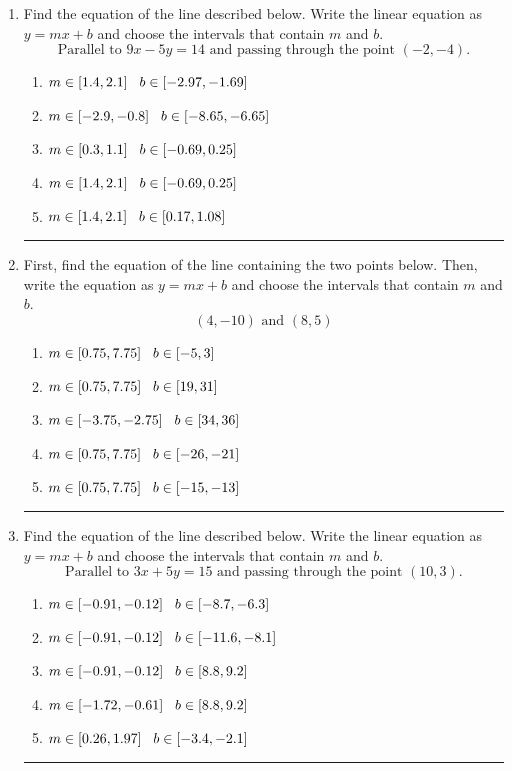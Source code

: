 \documentclass[14pt]{extbook}
\newcommand{\litem}[1]{\item#1\hspace*{-1cm}\rule{\textwidth}{0.4pt}}
\begin{document}
\begin{enumerate}
\litem{
Find the equation of the line described below. Write the linear equation as $ y=mx+b $ and choose the intervals that contain $m$ and $b$.\[ \text{Parallel to } 9 x - 5 y = 14 \text{ and passing through the point } (-2, -4). \]\begin{enumerate}[label=\Alph*.]
\item \( m \in [1.4, 2.1] \hspace*{3mm} b \in [-2.97, -1.69] \)
\item \( m \in [-2.9, -0.8] \hspace*{3mm} b \in [-8.65, -6.65] \)
\item \( m \in [0.3, 1.1] \hspace*{3mm} b \in [-0.69, 0.25] \)
\item \( m \in [1.4, 2.1] \hspace*{3mm} b \in [-0.69, 0.25] \)
\item \( m \in [1.4, 2.1] \hspace*{3mm} b \in [0.17, 1.08] \)

\end{enumerate} }
\litem{
First, find the equation of the line containing the two points below. Then, write the equation as $ y=mx+b $ and choose the intervals that contain $m$ and $b$.\[ (4, -10) \text{ and } (8, 5) \]\begin{enumerate}[label=\Alph*.]
\item \( m \in [0.75, 7.75] \hspace*{3mm} b \in [-5, 3] \)
\item \( m \in [0.75, 7.75] \hspace*{3mm} b \in [19, 31] \)
\item \( m \in [-3.75, -2.75] \hspace*{3mm} b \in [34, 36] \)
\item \( m \in [0.75, 7.75] \hspace*{3mm} b \in [-26, -21] \)
\item \( m \in [0.75, 7.75] \hspace*{3mm} b \in [-15, -13] \)

\end{enumerate} }
\litem{
Find the equation of the line described below. Write the linear equation as $ y=mx+b $ and choose the intervals that contain $m$ and $b$.\[ \text{Parallel to } 3 x + 5 y = 15 \text{ and passing through the point } (10, 3). \]\begin{enumerate}[label=\Alph*.]
\item \( m \in [-0.91, -0.12] \hspace*{3mm} b \in [-8.7, -6.3] \)
\item \( m \in [-0.91, -0.12] \hspace*{3mm} b \in [-11.6, -8.1] \)
\item \( m \in [-0.91, -0.12] \hspace*{3mm} b \in [8.8, 9.2] \)
\item \( m \in [-1.72, -0.61] \hspace*{3mm} b \in [8.8, 9.2] \)
\item \( m \in [0.26, 1.97] \hspace*{3mm} b \in [-3.4, -2.1] \)


\end{enumerate}}
\end{enumerate}
\end{document}

